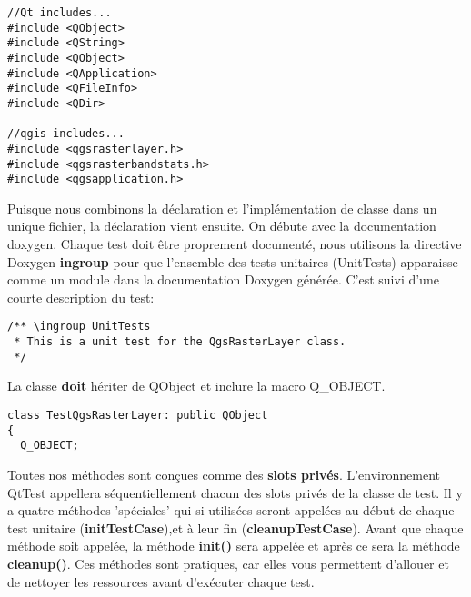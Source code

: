\begin{verbatim}
//Qt includes...
#include <QObject>
#include <QString>
#include <QObject>
#include <QApplication>
#include <QFileInfo>
#include <QDir>

//qgis includes...
#include <qgsrasterlayer.h> 
#include <qgsrasterbandstats.h> 
#include <qgsapplication.h>
\end{verbatim}

Puisque nous combinons la déclaration et l'implémentation de classe dans un unique fichier, la déclaration vient ensuite. On débute avec la documentation doxygen. Chaque test doit être proprement documenté, nous utilisons la directive Doxygen \textbf{ingroup} pour que l'ensemble des tests unitaires (UnitTests) apparaisse comme un module dans la documentation Doxygen générée. C'est suivi d'une courte description du test:

\begin{verbatim}
/** \ingroup UnitTests
 * This is a unit test for the QgsRasterLayer class.
 */
\end{verbatim}

La classe \textbf{doit} hériter de QObject et inclure la macro Q\_OBJECT.

\begin{verbatim}
class TestQgsRasterLayer: public QObject
{
  Q_OBJECT;
\end{verbatim}
Toutes nos méthodes sont conçues comme des \textbf{slots privés}. L'environnement QtTest appellera séquentiellement chacun des slots privés de la classe de test. Il y a quatre méthodes 'spéciales' qui si utilisées seront appelées au début de chaque test unitaire (\textbf{initTestCase}),et à leur fin (\textbf{cleanupTestCase}).  Avant que chaque méthode soit appelée, la méthode \textbf{init()} sera appelée et après ce sera la méthode  \textbf{cleanup()}. Ces méthodes sont pratiques, car elles vous permettent d'allouer et de nettoyer les ressources avant d'exécuter chaque test.

